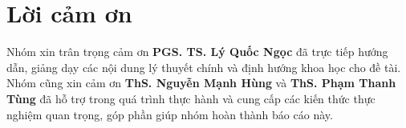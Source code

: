 \chapter*{Lời cảm ơn}

Nhóm xin trân trọng cảm ơn \textbf{PGS. TS. Lý Quốc Ngọc} đã trực tiếp hướng dẫn, giảng dạy các nội dung lý thuyết chính và định hướng khoa học cho đề tài.  
Nhóm cũng xin cảm ơn \textbf{ThS. Nguyễn Mạnh Hùng} và \textbf{ThS. Phạm Thanh Tùng} đã hỗ trợ trong quá trình thực hành và cung cấp các kiến thức thực nghiệm quan trọng, góp phần giúp nhóm hoàn thành báo cáo này.

\pagebreak